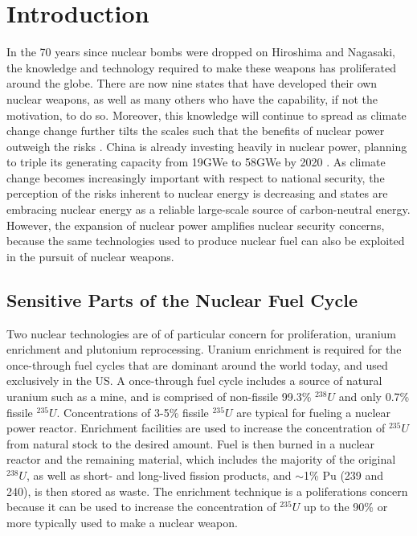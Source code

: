 \section{Introduction}
\label{s_motive}

In the 70 years since nuclear bombs were dropped on Hiroshima and Nagasaki, the knowledge and technology required to make these weapons has proliferated around the globe. There are now nine states that have developed their own nuclear weapons, as well as many others who have the capability, if not the motivation, to do so\cite{feiveson_unmaking_2014}.  
Moreover, this knowledge will continue to spread as climate change change further tilts the scales such that the benefits of nuclear power outweigh the risks \cite{mooney_why_2014}.
China is already investing heavily in nuclear power, planning to triple its generating capacity from 19GWe to 58GWe by 2020  \cite{_china_2014}.  As climate change becomes increasingly important with respect to national security, the perception of the risks inherent to nuclear energy is decreasing and states are embracing nuclear energy as a reliable large-scale source of carbon-neutral energy.  However, the expansion of nuclear power amplifies nuclear security concerns, because the same technologies used to produce nuclear fuel can also be exploited in the pursuit of nuclear weapons.


\subsection{Sensitive Parts of the Nuclear Fuel Cycle}

Two nuclear technologies are of of particular concern for proliferation, uranium enrichment and plutonium reprocessing.  Uranium enrichment is required for the once-through fuel cycles that are dominant around the world today, and used exclusively in the \gls{US}.  A once-through fuel cycle includes a source of natural uranium such as a mine, and is comprised of non-fissile 99.3\% $^{238}U$ and only 0.7\% fissile $^{235}U$. Concentrations of 3-5\% fissile $^{235}U$ are typical for fueling a nuclear power reactor.  
Enrichment facilities are used to increase the concentration of $^{235}U$ from natural stock to the desired amount.  Fuel is then burned in a nuclear reactor and the remaining material, which includes the majority of the original $^{238}U$, as well as short- and long-lived fission products, and $\sim$1\% Pu (239 and 240), is then stored as waste.  The enrichment technique is a poliferations concern because it can be used to increase the concentration of $^{235}U$ up to the 90\% or more typically used to make a nuclear weapon\cite{_military_2014}.

